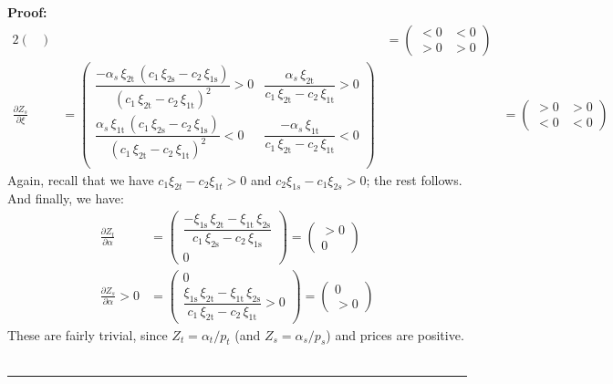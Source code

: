 \documentclass[11pt,a4paper]{extarticle}
\newenvironment{proof}[1][Proof]{\noindent\textbf{#1:} }{\ \rule{0.5em}{0.5em}}
\begin{document}
\begin{proof}
\begin{alignat*}{2}
\begin{pmatrix}
	\end{pmatrix}
	&&=
	\begin{pmatrix}
	< 0 & < 0  \\
	> 0 & > 0
	\end{pmatrix} \\
	\frac{\partial Z_s}{\partial \xi} &= 
	\begin{pmatrix}
	\dfrac{-\alpha _{s}\,\xi _{\mathrm{2t}}\,\left(c_{1}\,\xi _{\mathrm{2s}}-c_{2}\,\xi _{\mathrm{1s}}\right)}{{\left(c_{1}\,\xi _{\mathrm{2t}}-c_{2}\,\xi _{\mathrm{1t}}\right)}^2}> 0& \dfrac{\alpha _{s}\,\xi _{\mathrm{2t}}}{c_{1}\,\xi _{\mathrm{2t}}-c_{2}\,\xi _{\mathrm{1t}}} > 0\\
	\dfrac{\alpha _{s}\,\xi _{\mathrm{1t}}\,\left(c_{1}\,\xi _{\mathrm{2s}}-c_{2}\,\xi _{\mathrm{1s}}\right)}{{\left(c_{1}\,\xi _{\mathrm{2t}}-c_{2}\,\xi _{\mathrm{1t}}\right)}^2} < 0& \dfrac{-\alpha _{s}\,\xi _{\mathrm{1t}}}{c_{1}\,\xi _{\mathrm{2t}}-c_{2}\,\xi _{\mathrm{1t}}} <0\\
	\end{pmatrix}
	&&=
	\begin{pmatrix}
	> 0 & > 0 \\
	< 0 & < 0  
	\end{pmatrix}
	\end{alignat*}
	Again, recall that we have $c_1 \xi_{2t} - c_2 \xi_{1t} > 0$ and $c_2 \xi_{1s} - c_1 \xi_{2s} > 0$; the rest follows. And finally, we have:
	\begin{align*}
	\frac{\partial Z_t}{\partial \alpha} &= 
	\begin{pmatrix}
	\dfrac{-\xi _{\mathrm{1s}}\,\xi _{\mathrm{2t}}-\xi _{\mathrm{1t}}\,\xi _{\mathrm{2s}}}{c_{1}\,\xi _{\mathrm{2s}}-c_{2}\,\xi _{\mathrm{1s}}} \\
	0
	\end{pmatrix}
	=
	\begin{pmatrix}
	> 0 \\
	0 
	\end{pmatrix} \\
	\frac{\partial Z_s}{\partial \alpha}> 0 &= 
	\begin{pmatrix}
	0 \\
	\dfrac{\xi _{\mathrm{1s}}\,\xi _{\mathrm{2t}}-\xi _{\mathrm{1t}}\,\xi _{\mathrm{2s}}}{c_{1}\,\xi _{\mathrm{2t}}-c_{2}\,\xi _{\mathrm{1t}}} > 0
	\end{pmatrix}
	=
	\begin{pmatrix}
	0 \\
	> 0 
	\end{pmatrix}
	\end{align*}
	These are fairly trivial, since $Z_t = \alpha_t / p_t$ (and $Z_s = \alpha_s/ p_s$) and prices are positive. \\
	\hfill
\end{proof}
\end{document}
